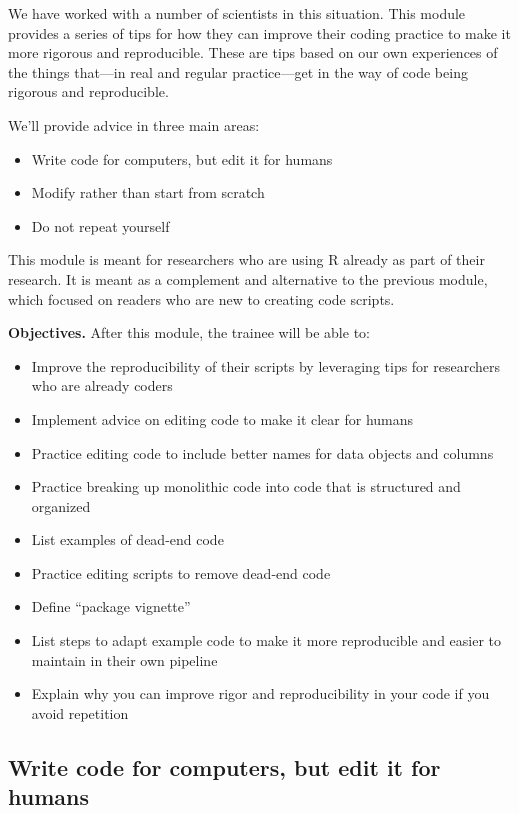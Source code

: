 \documentclass[]{tufte-book}
\providecommand{\tightlist}{%
  \setlength{\itemsep}{0pt}\setlength{\parskip}{0pt}}
\begin{document}
We have worked with a number of scientists in this situation. This module
provides a series of tips for how they can improve their coding practice to
make it more rigorous and reproducible. These are tips based on our own
experiences of the things that---in real and regular practice---get in the
way of code being rigorous and reproducible.

We'll provide advice in three main areas:

\begin{itemize}
\tightlist
\item
  Write code for computers, but edit it for humans
\item
  Modify rather than start from scratch
\item
  Do not repeat yourself
\end{itemize}

This module is meant for researchers who are using R already as part of their
research. It is meant as a complement and alternative to the previous module,
which focused on readers who are new to creating code scripts.

\textbf{Objectives.} After this module, the trainee will be able to:

\begin{itemize}
\tightlist
\item
  Improve the reproducibility of their scripts by leveraging tips for
  researchers who are already coders
\item
  Implement advice on editing code to make it clear for humans
\item
  Practice editing code to include better names for data objects and columns
\item
  Practice breaking up monolithic code into code that is structured and
  organized
\item
  List examples of dead-end code
\item
  Practice editing scripts to remove dead-end code
\item
  Define ``package vignette''
\item
  List steps to adapt example code to make it more reproducible and easier
  to maintain in their own pipeline
\item
  Explain why you can improve rigor and reproducibility in your code if you
  avoid repetition
\end{itemize}

\subsection{Write code for computers, but edit it for humans}\label{write-code-for-computers-but-edit-it-for-humans}
\end{document}
